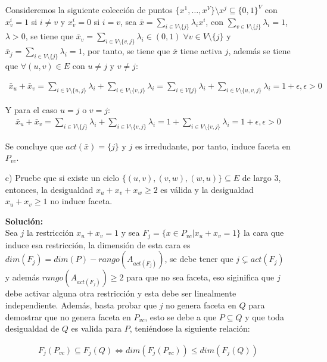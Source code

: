 \documentclass[10pt]{article}
\theoremstyle{plain}
\theoremstyle{definition}
\begin{document}
\begin{itemize}
Consideremos la siguiente colección de puntos $\{x^{1}, \ldots, x^{V}\}\setminus{x^{j}}\subseteq\{0,1\}^{V}$ con $x^{i}_{v}=1$ si $i\neq v$ y $x^{i}_{v}=0$ si $i=v$, sea $\bar{x}=\sum_{i \in V\setminus\{j\}}\lambda_{i}x^{i}$, con $\sum_{v\in V\setminus\{j\}}\lambda_{i}=1$, $\lambda>0$, se tiene que $\bar{x}_{v}=\sum_{i \in V\setminus\{v,j\}}\lambda_{i} \in (0,1) \;\forall v \in V\setminus\{j\}$ y $\bar{x}_{j}=\sum_{i \in V\setminus\{j\}}\lambda_{i}=1$, por tanto, se tiene que $\bar{x}$ tiene activa $j$, además se tiene que $\forall (u,v) \in E$ con $u\neq j$ y $v\neq j$:

\begin{align*}
\bar{x}_{u}+\bar{x}_{v}=\sum_{i \in V\setminus\{u,j\}}\lambda_{i}+\sum_{i \in V\setminus\{v,j\}}\lambda_{i}=\sum_{i \in V\{j\}}\lambda_{i} +\sum_{i\in V\setminus\{u,v,j\}}\lambda_{i}=1+\epsilon, \epsilon>0
\end{align*}

Y para el caso $u=j$ o $v=j$:
\begin{align*}
\bar{x}_{u}+\bar{x}_{v} = \sum_{i \in V\setminus\{j\}}\lambda_{i}+\sum_{i \in V\setminus\{v, j\}}\lambda_{i}= 1+\sum_{i \in V\setminus\{v, j\}}\lambda_{i}=1+\epsilon, \epsilon>0
\end{align*}

Se concluye que $act(\bar{x})=\{j\}$ y $j$ es irredudante, por tanto, induce faceta en $P_{vc}$.

\item[c)] Pruebe que si existe un ciclo $\{(u,v), (v,w), (w,u)\}\subseteq E$ de largo 3, entonces, la desigualdad $x_{u}+x_{v}+x_{w}\geq2$ es válida y la desigualdad $x_{u}+x_{v}\geq1$ no induce faceta.

\textbf{Solución:}\\

Sea $j$ la restricción $x_{u}+x_{v}=1$ y sea $F_{j}=\{x\in P_{vc}| x_{u}+x_{v}=1\}$ la cara que induce esa restricción, la dimensión de esta cara es $dim(F_{j}) = dim(P)-rango(A_{act(F_{j})})$, se debe tener que $j \subsetneq act(F_{j})$ y además $rango(A_{act(F_{j})})\geq2$ para que no sea faceta, eso siginifica que $j$ debe activar alguna otra restricción y esta debe ser linealmente independiente. Además, basta probar que $j$ no genera faceta en $Q$ para demostrar que no genera faceta en $P_{vc}$, esto se debe a que $P\subseteq Q$ y que toda desigualdad de $Q$ es valida para $P$, teniéndose la siguiente relación:

\begin{align*}
  F_{j}(P_{vc})\subseteq F_{j}(Q) \Leftrightarrow dim(F_{j}(P_{vc}))\leq dim(F_{j}(Q))
\end{align*}


\end{itemize}
\end{document}
